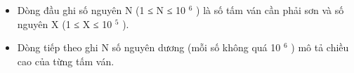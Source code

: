 \begin{itemize}
	\item     Dòng đầu ghi số nguyên N (1 ≤ N ≤ 10    $^     6    $    ) là số tấm ván cần phải sơn và số nguyên X (1 ≤ X ≤ 10    $^     5    $    ).   
	\item     Dòng tiếp theo ghi N số nguyên dương (mỗi số không quá 10    $^     6    $    ) mô tả chiều cao của từng tấm ván.   
\end{itemize}

\